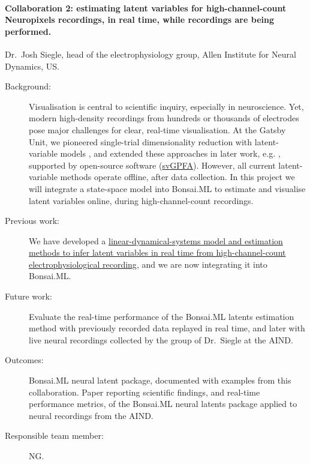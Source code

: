 \paragraph{Collaboration 2: estimating latent variables for high-channel-count
Neuropixels recordings, in real time, while recordings are being performed.}
Dr.~Josh Siegle, head of the electrophysiology group, Allen Institute for
Neural Dynamics, US.

\begin{description}

    \item[Background:] Visualisation is central to scientific inquiry,
        especially in neuroscience. Yet, modern high-density recordings from
        hundreds or thousands of electrodes pose major challenges for clear,
        real-time visualisation. At the Gatsby Unit, we pioneered single-trial
        dimensionality reduction with latent-variable models \citep{yuEtAl09},
        and extended these approaches in later work, e.g.
        \citep{dunckerAndSahani18}, supported by open-source software
        (\href{https://github.com/joacorapela/svGPFA}{svGPFA}). However, all
        current latent-variable methods operate offline, after data collection.
        In this project we will integrate a state-space model into Bonsai.ML to
        estimate and visualise latent variables online, during
        high-channel-count recordings.

    \item[Previous work:] We have developed a
        \href{https://joacorapela.github.io/ssm/auto_examples/neuralLatents/plot_MC_MAZE_SMALL.html#sphx-glr-auto-examples-neurallatents-plot-mc-maze-small-py}{linear-dynamical-systems
        model and estimation methods to infer latent variables in real time
        from high-channel-count electrophysiological recording}, and we are now
        integrating it into Bonsai.ML.


    \item[Future work:] Evaluate the real-time performance of the Bonsai.ML
        latents estimation method with previously recorded data replayed in
        real time, and later with live neural recordings collected by the group
        of Dr.~Siegle at the AIND.

    \item[Outcomes:] Bonsai.ML neural latent package, documented with examples
        from this collaboration. Paper reporting scientific findings, and
        real-time performance metrics, of the Bonsai.ML neural latents package
        applied to neural recordings from the AIND.

    \item[Responsible team member:] NG.

\end{description}

